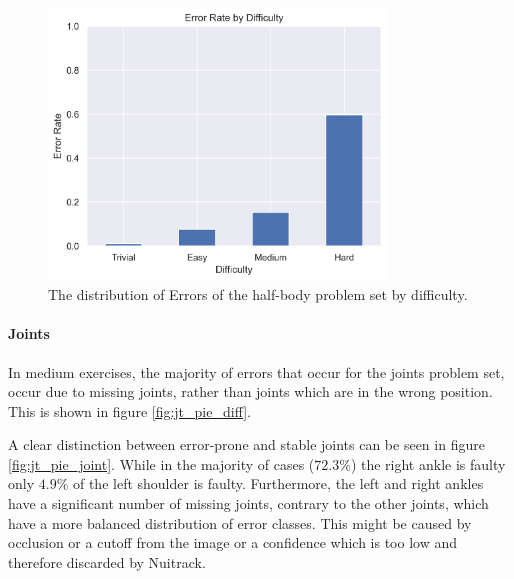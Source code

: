 \begin{figure}[ht]
  \centering
  \includegraphics[width=0.8\textwidth]{figures/Data/dist_limbs/Error_Rate_by_Difficulty.png}
  \caption[Error Distribution of the body parts by difficulty]{The distribution of Errors of the half-body problem set by difficulty.}
  \label{fig:lb_diff_dist}
\end{figure}

\paragraph{Joints}

In medium exercises, the majority of errors that occur for the joints problem set, occur due to missing joints, rather than joints which are in the wrong position. This is shown in figure \ref{fig:jt_pie_diff}.

A clear distinction between error-prone and stable joints can be seen in figure \ref{fig:jt_pie_joint}. While in the majority of cases ($72.3\%$) the right ankle is faulty only $4.9\%$ of the left shoulder is faulty. Furthermore, the left and right ankles have a significant number of missing joints, contrary to the other joints, which have a more balanced distribution of error classes. This might be caused by occlusion or a cutoff from the image or a confidence which is too low and therefore discarded by Nuitrack.

